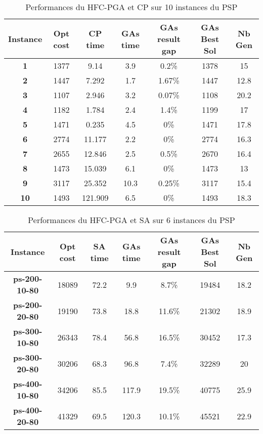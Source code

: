 	\begin{table}[h]
		\centering
		\begin{tabular}{|c|c|c|c|c|c|c|}
			\hline
			\textbf{Instance} & \textbf{Opt cost} & \textbf{CP time} & \textbf{GAs time} & \textbf{GAs result gap} & \textbf{GAs Best Sol} & \textbf{Nb Gen}\\
			\hline
			\textbf{1} & 1377 & 9.14 & 3.9 & 0.2\% & 1378 & 15 \\
			\textbf{2} & 1447 & 7.292 & 1.7 & 1.67\% & 1447 & 12.8\\
			\textbf{3} & 1107 & 2.946 & 3.2 & 0.07\% & 1108 & 20.2\\
			\textbf{4} & 1182 & 1.784 & 2.4 & 1.4\% & 1199 & 17\\
			\textbf{5} & 1471 & 0.235 & 4.5 & 0\% & 1471 & 17.8\\
			\textbf{6} & 2774 & 11.177 & 2.2 & 0\% & 2774 & 16.3\\
			\textbf{7} & 2655 & 12.846 & 2.5 & 0.5\% & 2670 & 16.4\\
			\textbf{8} & 1473 & 15.039 & 6.1 & 0\% & 1473 & 13\\
			\textbf{9} & 3117 & 25.352 & 10.3 & 0.25\% & 3117 & 15.4\\
			\textbf{10} & 1493 & 121.909 & 6.5 & 0\% & 1493 & 18.3\\
			\hline
		\end{tabular}	
		\caption{Performances du HFC-PGA et CP sur 10 instances du PSP}	
		\label{tab:hfc_pga_cp}
	\end{table}			
	
	\begin{table}[h]
		\centering
		\begin{tabular}{|c|c|c|c|c|c|c|}
			\hline
			\textbf{Instance} & \textbf{Opt cost} & \textbf{SA time} & \textbf{GAs time} & \textbf{GAs result gap} & \textbf{GAs Best Sol} & \textbf{Nb Gen}\\
			\hline
			\textbf{ps-200-10-80} & 18089 & 72.2 & 9.9 & 8.7\% & 19484 & 18.2 \\
			\textbf{ps-200-20-80} & 19190 & 73.8 & 18.8 & 11.6\% & 21302 & 18.9 \\
			\textbf{ps-300-10-80} & 26343 & 78.4 & 56.8 & 16.5\% & 30452 & 17.3 \\
			\textbf{ps-300-20-80} & 30206 & 68.3 & 96.8 & 7.4\% & 32289 & 20 \\
			\textbf{ps-400-10-80} & 34206 & 85.5 & 117.9 & 19.5\% & 40775 & 25.9 \\
			\textbf{ps-400-20-80} & 41329 & 69.5 & 120.3 & 10.1\% & 45521 & 22.9 \\
			\hline
		\end{tabular}	
		\caption{Performances du HFC-PGA et SA sur 6 instances du PSP}
		\label{tab:hfc_pga_sa}	
	\end{table}			
		
